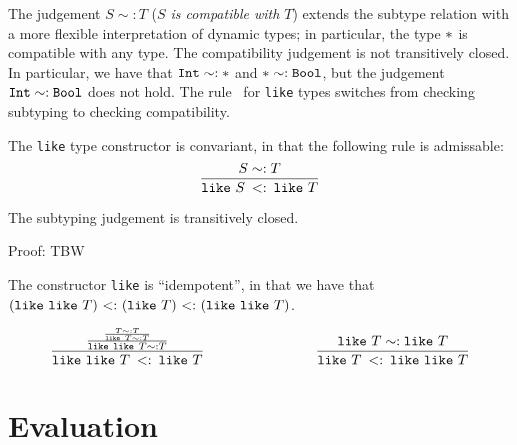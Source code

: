 \documentclass{article}
\newcommand{\Int}{\t{Int}}
\newcommand{\Bool}{\t{Bool}}
\newcommand{\dynamic}{\t{*}}
\newcommand{\subtype}[2]{#1 \,\sword\, #2}
\newcommand{\sword}{\mbox{\,\,$<:$\,\,}}
\renewcommand{\t}[1]{{\tt #1}}
\newcommand{\likety}[1]{\t{like}~#1}
\newcommand{\compatible}[2]{#1 \sim: #2 }
\begin{document}
The judgement $\compatible{S}{T}$  (\emph{$S$ is compatible with $T$}) 
extends the subtype relation with a more flexible interpretation of dynamic types; 
in particular, the type $\dynamic$ is compatible with any type.
The compatibility judgement is not transitively closed.
In particular, we have that   $\compatible{\Int}{\dynamic}$ and
$\compatible{\dynamic}{\Bool}$, but the judgement $\compatible{\Int}{\Bool}$ does not hold. 
The rule~ for \t{like} types switches from checking subtyping to checking compatibility.

The \t{like} type constructor is convariant, in that the following rule is admissable:
\[
	\frac{
		\compatible S T
	}{
		\subtype{\likety S}{\likety T}
	}
\]

\begin{lemma}
The subtyping judgement is transitively closed.
\end{lemma}
Proof: TBW

The constructor \t{like} is ``idempotent'', in that we have that $({\likety{\likety{T}}}) \sword ({\likety{T}}) \sword ({\likety{\likety{T}}})$.

\[
	\frac{
		\frac{
			\frac{
				 	\compatible T T 
				}{				
					\compatible {\likety T} T
				}
			}{
				\compatible {\likety {\likety T}} T
			}
		}{
			\subtype {\likety {\likety T}} {\likety T}
		}
		\qquad\qquad\qquad\qquad
	\frac{
			\compatible {\likety T} {\likety T}
		}{
			\subtype {\likety T} {\likety {\likety T}}
		}
\]

\clearpage
\section{Evaluation}
\end{document}
